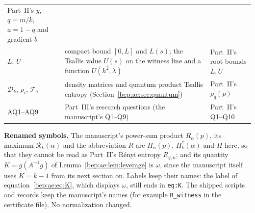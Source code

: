 \documentclass[11pt]{article}
\numberwithin{equation}{section}
\theoremstyle{definition}
\theoremstyle{remark}
\begin{document}
\begin{longtable}{@{}>{\raggedright\arraybackslash}p{}
 >{\raggedright\arraybackslash}p{}
 >{\raggedright\arraybackslash}p{}@{}}
 Part~II's $y$, $q=m/k$, $a=1-q$ and gradient $b$\\
$L$; $U$ & compact bound $[0,L]$ and $L(s)$; the Tsallis value $U(s)$
 on the witness line and a function $U(h^2,\lambda)$ & Part~II's root
 bounds $L,U$\\
$\mathcal D_k$, $\rho_i$, $\mathcal T_q$ & density matrices and
 quantum product Tsallis entropy (Section~\ref{bep:ae:sec:quantum}) &
 Part~II's $\rho_q(p)$\\
AQ1--AQ9 & Part~III's research questions (the manuscript's Q1--Q9) &
 Part~II's Q1--Q10\\
\bottomrule
\end{longtable}
\endgroup

\noindent\textbf{Renamed symbols.} The manuscript's power-sum product
$R_\alpha(p)$, its maximum $\mathcal R_k(\alpha)$ and the abbreviation
$R$ are $\Pi_\alpha(p)$, $\Pi^{*}_k(\alpha)$ and $\Pi$ here, so that they
cannot be read as Part~II's R\'enyi entropy $R_{q,n}$; and its quantity
$K=g(A^{-1}g)$ of Lemma~\ref{bep:ae:lem:leverage} is $\omega$, since the
manuscript itself uses $K=k-1$ from its next section on. Labels keep
their names: the label of equation~\eqref{bep:ae:eq:K}, which displays
$\omega$, still ends in \texttt{eq:K}. The shipped scripts
and records keep the manuscript's names (for example \texttt{R\_witness}
in the certificate file). No normalization changed.
\end{document}
